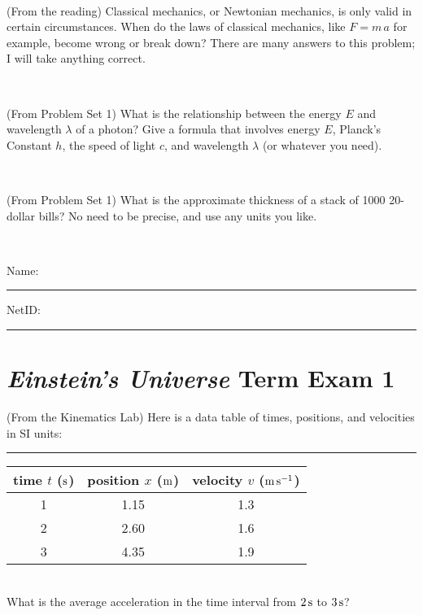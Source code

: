 \documentclass[12pt, letterpaper]{article}
\begin{document}
\vfill ~

\begin{problem} (From the reading)
Classical mechanics, or Newtonian mechanics, is only valid in certain
circumstances. When do the laws of classical mechanics, like $F =
m\,a$ for example, become wrong or break down? There are many answers
to this problem; I will take anything correct.
\end{problem}


\vfill ~

\begin{problem} (From Problem Set 1)
What is the relationship between the energy $E$ and wavelength
$\lambda$ of a photon? Give a formula that involves energy $E$,
Planck's Constant $h$, the speed of light $c$, and wavelength
$\lambda$ (or whatever you need).
\end{problem}

\vfill ~

\begin{problem} (From Problem Set 1)
What is the approximate thickness of a stack of 1000 20-dollar bills?
No need to be precise, and use any units you like.
\end{problem}


\vfill ~


\cleardoublepage



\noindent
Name: \rule[-1ex]{0.60\textwidth}{0.1pt}
NetID: \rule[-1ex]{0.20\textwidth}{0.1pt}

\section*{\textsl{Einstein's Universe} Term Exam 1}
\setcounter{problem}{1}


\begin{problem} (From the Kinematics Lab)
Here is a data table of times, positions, and velocities in SI units:\\
\rule{1.0in}{0pt}\begin{tabular}{c|c|c}
time $t$ ($\mathrm{s}$) & position $x$ ($\mathrm{m}$) & velocity $v$ ($\mathrm{m}\,\mathrm{s}^{-1}$) \\
\hline
1 & 1.15 & 1.3 \\
2 & 2.60 & 1.6 \\
3 & 4.35 & 1.9 \\
\hline
\end{tabular}\\
What is the average acceleration in the time interval from $2\,\mathrm{s}$ to $3\,\mathrm{s}$?
\end{problem}
\end{document}
